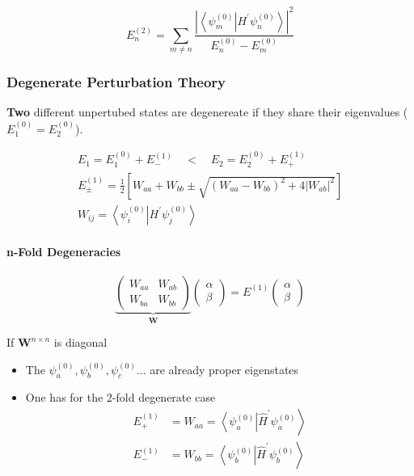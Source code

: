 \begin{equation*}
    E_{n}^{(2)}=\sum_{m\neq n}\frac{\left|\left\langle\psi_{m}^{(0)}\right|H^{\prime}\left.\psi_{n}^{(0)}\right\rangle\right|^{2}}{E_{n}^{(0)}-E_{m}^{(0)}}
\end{equation*}

\subsubsection{Degenerate Perturbation Theory}
\textbf{Two} different unpertubed states are degenereate if they share their eigenvalues ($E_1^{(0)} = E_2^{(0)}$).

\newpar{}
\noindent\begin{gather*}
    E_1 = E_1^{(0)} + E_{-}^{(1)} \quad < \quad E_2 = E_2^{(0)} + E_{+}^{(1)}\\
    E_{\pm}^{(1)}=\frac{1}{2}\left[W_{aa}+W_{bb}\pm\sqrt{{(W_{aa}-W_{bb})}^{2}+4 |W_{ab}|^{2}}\right]\\
    W_{ij}=\left\langle\psi_{i}^{(0)} \right| H^{\prime} \left.\psi_{j}^{(0)}\right\rangle
\end{gather*}

\paragraph{n-Fold Degeneracies}
\noindent\begin{equation*}
    \underbrace{
        \left(\begin{array}{cc}
            W_{aa} & W_{ab} \\
            W_{ba} & W_{bb}
        \end{array}\right)}_{\mathbf{W}}
    \left(\begin{array}{c}
            \alpha \\
            \beta
        \end{array}\right)
    =E^{(1)}\left(\begin{array}{c}
            \alpha \\
            \beta
        \end{array}\right)
\end{equation*}

If $\mathbf{W}^{n\times n}$ is diagonal
\begin{itemize}
    \item The $\psi_a^{(0)},\psi_b^{(0)},\psi_c^{(0)} \dots $ are already proper eigenstates
    \item One has for the 2-fold degenerate case
          \begin{align*}
              E_{+}^{(1)} & =W_{aa}=\left\langle\psi_{a}^{(0)}\right|\left.\widehat{H}^{\prime}\psi_{a}^{(0)}\right\rangle \\
              E_{-}^{(1)} & =W_{bb}=\left\langle\psi_{b}^{(0)}\right|\left.\widehat{H}^{\prime}\psi_{b}^{(0)}\right\rangle
          \end{align*}
\end{itemize}

